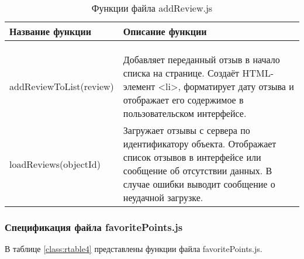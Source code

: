\renewcommand{\arraystretch}{0.8} %
\begin{xltabular}{\textwidth}{|l|X|}
	\caption{Функции файла addReview.js\label{class:rtable3}}\\
	\hline \centrow Название функции & \centrow Описание функции\\
	\hline {} & \\ \hline
	\endfirsthead
	\\
	\hline {} & \\ \hline
	\finishhead
	addReviewToList(review) & Добавляет переданный отзыв в начало списка на странице. Создаёт HTML-элемент <li>, форматирует дату отзыва и отображает его содержимое в пользовательском интерфейсе.\\
	\hline loadReviews(objectId) & Загружает отзывы с сервера по идентификатору объекта. Отображает список отзывов в интерфейсе или сообщение об отсутствии данных. В случае ошибки выводит сообщение о неудачной загрузке.\\
\end{xltabular}

\subsubsection{Спецификация файла favoritePoints.js}

В таблице \ref{class:rtable4} представлены функции файла favoritePoints.js.

